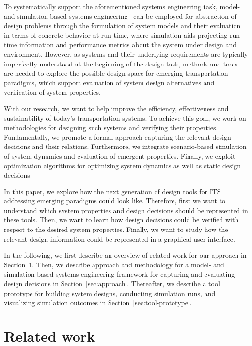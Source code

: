 \documentclass[a4paper,twoside]{article}
\begin{document}
	To systematically support the aforementioned systems engineering task, model- and simulation-based systems engineering~\cite{gianni2014modeling} can be employed for abstraction of design problems through the formulation of system models and their evaluation in terms of concrete behavior at run time, where simulation aids projecting run-time information and performance metrics about the system under design and environment. 
	However, as systems and their underlying requirements are typically imperfectly understood at the beginning of the design task, methods and tools are needed to explore the possible design space for emerging transportation paradigms, which support evaluation of system design alternatives and verification of system properties.
	
	With our research, we want to help improve the efficiency, effectiveness and sustainability of today's transportation systems.
	To achieve this goal, we work on methodologies for designing such systems and verifying their properties.
	Fundamentally, we promote a formal approach capturing the relevant design decisions and their relations.
	Furthermore, we integrate scenario-based simulation of system dynamics and evaluation of emergent properties.
	Finally, we exploit optimization algorithms for optimizing system dynamics as well as static design decisions.
	
	
	In this paper, we explore how the next generation of design tools for ITS addressing emerging paradigms could look like.
	Therefore, first we want to understand which system properties and design decisions should be represented in these tools.
	Then, we want to learn how design decisions could be verified with respect to the desired system properties.
	Finally, we want to study how the relevant design information could be represented in a graphical user interface.
	
	
	In the following, we first describe an overview of related work for our approach in Section~\ref{sec:related-work}.
	Then, we describe approach and methodology for a model- and simulation-based systems engineering framework for capturing and evaluating design decisions in Section~\ref{sec:approach}.
	Thereafter, we describe a tool prototype for building system designs, conducting simulation runs, and visualizing simulation outcomes in Section~\ref{sec:tool-prototype}.
	
	\section{Related work}
	\label{sec:related-work}
\end{document}
